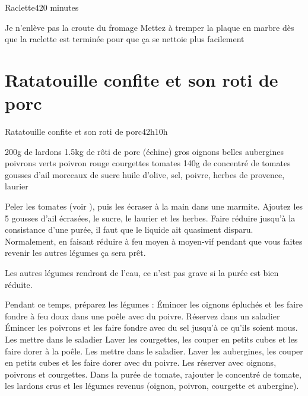 {\begin{recette}{Raclette}{4}{20 minutes}{}
\begin{ingredients}
\end{ingredients}

\begin{preparation}
\etape Je n'enlève pas la croute du fromage
\etape Mettez à tremper la plaque en marbre dès que la raclette est terminée pour que ça se nettoie plus facilement
\end{preparation}
\end{recette}

\section{Ratatouille confite et son roti de porc}
\begin{recette}{Ratatouille confite et son roti de porc}{4}{2h}{10h}
\begin{ingredients}
\ingredient 200g de lardons %
\ingredient 1.5kg de rôti de porc (échine)
 gros oignons
 belles aubergines
 poivrons verts
 poivron rouge
 courgettes
 tomates
\ingredient 140g de concentré de tomates
 gousses d'ail
 morceaux de sucre
\ingredient huile d'olive, sel, poivre, herbes de provence, laurier
\end{ingredients}

\begin{preparation}
\etape Peler les tomates (voir ), puis les écraser à la main dans une marmite. Ajoutez les 5 gousses 
d'ail écrasées, le sucre, le laurier et les herbes. 
\etape Faire réduire jusqu'à la consistance d'une purée, il faut que le liquide ait quasiment disparu. Normalement, en faisant 
réduire à feu moyen à moyen-vif pendant que vous faites revenir les autres légumes ça sera prêt. 
\begin{remarque}
Les autres légumes rendront de l'eau, ce n'est pas grave si la purée est bien réduite.
\end{remarque}
\etape Pendant ce temps, préparez les légumes : 
\etape Émincer les oignons épluchés et les faire fondre à feu doux dans une poêle avec du poivre. Réservez dans un saladier
\etape Émincer les poivrons et les faire fondre avec du sel jusqu'à ce qu'ils soient mous. Les mettre dans le saladier
\etape Laver les courgettes, les couper en petits cubes et les faire dorer à la poêle. Les mettre dans le saladier.
\etape Laver les aubergines, les couper en petits cubes et les faire dorer avec du poivre. Les réserver avec oignons, poivrons 
et courgettes.
\etape Dans la purée de tomate, rajouter le concentré de tomate, les lardons crus et les légumes revenus (oignon, poivron, 
courgette et aubergine).
\end{preparation}


\end{recette}}
